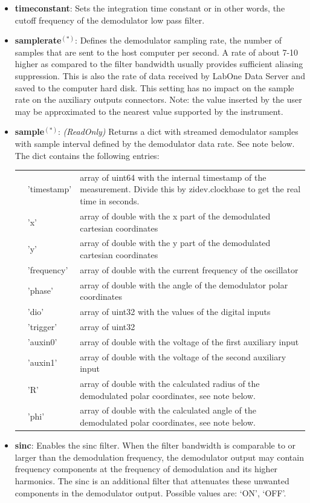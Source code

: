 \documentclass[11pt]{article} %
\begin{document}
\begin{itemize}
	\item {\bf timeconstant}: Sets the integration time constant or in other words, the cutoff frequency of the demodulator low pass filter.
	\item {\bf samplerate}$^{(*)}$: Defines the demodulator sampling rate, the number of samples that are sent to the host computer per second. A rate of about 7-10 higher as compared to the filter bandwidth usually provides sufficient aliasing suppression. This is also the rate of data received by LabOne Data Server and saved to the computer hard disk. This setting has no impact on the sample rate on the auxiliary outputs connectors. Note: the value inserted by the user may be approximated to the nearest value supported by the instrument.
	\item {\bf sample}$^{(*)}$: {\it (ReadOnly)} Returns a dict with streamed demodulator samples with sample interval defined by the demodulator data rate. See note below. The dict contains the following entries:
	\begin{longtable}{p{1.5cm}p{3cm}p{12cm}}
	& 'timestamp' & array of uint64 with the internal timestamp of the measurement. Divide this by zidev.clockbase to get the real time in seconds. \\
	& 'x' & array of double with the x part of the demodulated cartesian coordinates \\
	& 'y' & array of double with the y part of the demodulated cartesian coordinates \\
	& 'frequency' & array of double with the current frequency of the oscillator \\
	& 'phase' & array of double with the angle of the demodulator polar coordinates \\
	& 'dio' & array of uint32 with the values of the digital inputs \\
	& 'trigger' & array of uint32 \\
	& 'auxin0' & array of double with the voltage of the first auxiliary input \\
	& 'auxin1' & array of double with the voltage of the second auxiliary input \\
	& 'R' & array of double with the calculated radius of the demodulated polar coordinates, see note below. \\
	& 'phi' & array of double with the calculated angle of the demodulated polar coordinates, see note below. \\
	\end{longtable}
	\item {\bf sinc}: Enables the sinc filter. When the filter bandwidth is comparable to or larger than the demodulation frequency, the demodulator output may contain frequency components at the frequency of demodulation and its higher harmonics. The sinc is an additional filter that attenuates these unwanted components in the demodulator output. Possible values are: `ON', `OFF'.

\end{itemize}
\end{document}
